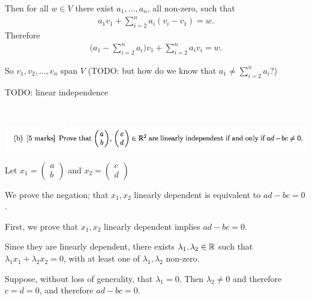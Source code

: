 \documentclass[12pt]{article}
\begin{document}
Then for all $w \in V$ there exist $a_1, \ldots, a_n$, all non-zero, such that
\begin{align*}
  a_1v_1 + \sum_{i=2}^n a_i(v_i - v_1) = w.
\end{align*}
Therefore
\begin{align*}
  \Big(a_1 - \sum_{i=2}^na_i\Big)v_1 + \sum_{i=2}^n a_iv_i = w.
\end{align*}

So $v_1, v_2, \ldots, v_n$ span $V$ (TODO: but how do we know that $a_1 \neq \sum_{i=2}^na_i$?)

TODO: linear independence

~\\
\newpage
\begin{mdframed}
\includegraphics[width=400pt]{img/oxford-prelims-2017-A-1-2.png}
\end{mdframed}

\renewcommand{\cvec}[2]{\begin{pmatrix}#1\\#2\end{pmatrix}}

Let $x_1 = \cvec{a}{b}$ and $x_2 = \cvec{c}{d}$

We prove the negation; that $x_1, x_2$ linearly dependent is equivalent to
$ad - bc = 0$.

First, we prove that $x_1, x_2$ linearly dependent implies $ad - bc = 0$.

Since they are linearly dependent, there exists $\lambda_1, \lambda_2 \in \mathbb{R}$
such that $\lambda_1x_1 + \lambda_2x_2 = 0$, with at least one of
$\lambda_1, \lambda_2$ non-zero.

Suppose, without loss of generality, that $\lambda_1 = 0$. Then
$\lambda_2 \neq 0$ and therefore $c = d = 0$, and therefore $ad - bc = 0$.
\end{document}
